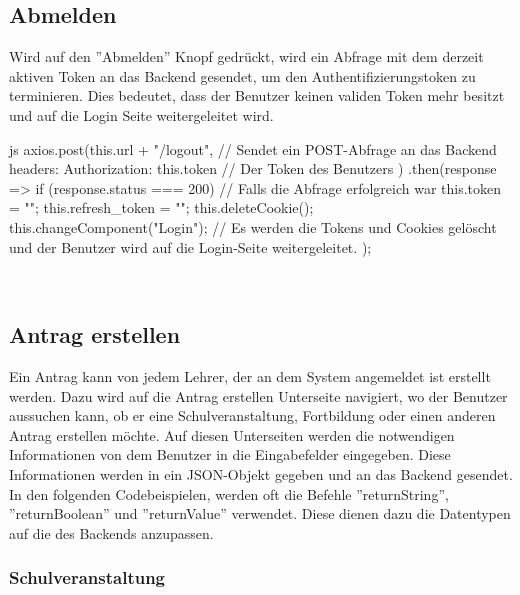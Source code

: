 \subsection{Abmelden}
Wird auf den ''Abmelden'' Knopf gedrückt, wird ein Abfrage mit dem derzeit aktiven Token an das Backend gesendet, um den Authentifizierungstoken zu terminieren. Dies bedeutet, dass der Benutzer keinen validen Token mehr besitzt und auf die Login Seite weitergeleitet wird.
\begin{code}{js}
axios.post(this.url + "/logout", {	// Sendet ein POST-Abfrage an das Backend
	headers: { Authorization: this.token }	// Der Token des Benutzers
})
.then(response => {
	if (response.status === 200) {	// Falls die Abfrage erfolgreich war
		this.token = "";
		this.refresh_token = "";
		this.deleteCookie();
		this.changeComponent("Login");	// Es werden die Tokens und Cookies gelöscht und der Benutzer wird auf die Login-Seite weitergeleitet.
	}
});
\end{code}
~\\
\newpage
\subsection{Antrag erstellen}
Ein Antrag kann von jedem Lehrer, der an dem System angemeldet ist erstellt werden. Dazu wird auf die Antrag erstellen Unterseite navigiert, wo der Benutzer aussuchen kann, ob er eine Schulveranstaltung, Fortbildung oder einen anderen Antrag erstellen möchte. Auf diesen Unterseiten werden die notwendigen Informationen von dem Benutzer in die Eingabefelder eingegeben. Diese Informationen werden in ein JSON-Objekt gegeben und an das Backend gesendet.
\\
In den folgenden Codebeispielen, werden oft die Befehle ''returnString'', ''returnBoolean'' und ''returnValue'' verwendet. Diese dienen dazu die Datentypen auf die des Backends anzupassen. 
\subsubsection{Schulveranstaltung}
